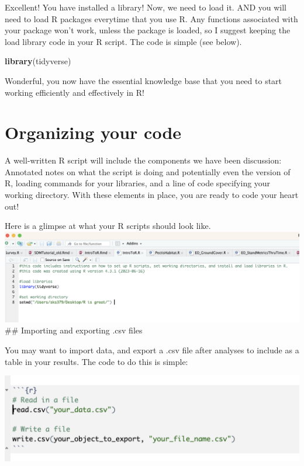 \documentclass[
]{book}
\newenvironment{Shaded}{\begin{snugshade}}{\end{snugshade}}
\newcommand{\FunctionTok}[1]{\textcolor[rgb]{0.13,0.29,0.53}{\textbf{#1}}}
\newcommand{\NormalTok}[1]{#1}
\begin{document}
Excellent! You have installed a library! Now, we need to load it. AND you will need to load R packages everytime that you use R. Any functions associated with your package won't work, unless the package is loaded, so I suggest keeping the load library code in your R script. The code is simple (see below).

\begin{Shaded}
\begin{Highlighting}[]
\FunctionTok{library}\NormalTok{(tidyverse)}
\end{Highlighting}
\end{Shaded}

Wonderful, you now have the essential knowledge base that you need to start working efficiently and effectively in R!

\hypertarget{organizing-your-code}{%
\section{Organizing your code}\label{organizing-your-code}}

A well-written R script will include the components we have been discussion: Annotated notes on what the script is doing and potentially even the version of R, loading commands for your libraries, and a line of code specifying your working directory. With these elements in place, you are ready to code your heart out!

Here is a glimpse at what your R scripts should look like.
\includegraphics{images/01-intro/RScriptSetUp.png}
\#\# Importing and exporting .csv files

You may want to import data, and export a .csv file after analyses to include as a table in your results. The code to do this is simple:

\includegraphics{images/01-intro/importexport.png}
\end{document}
